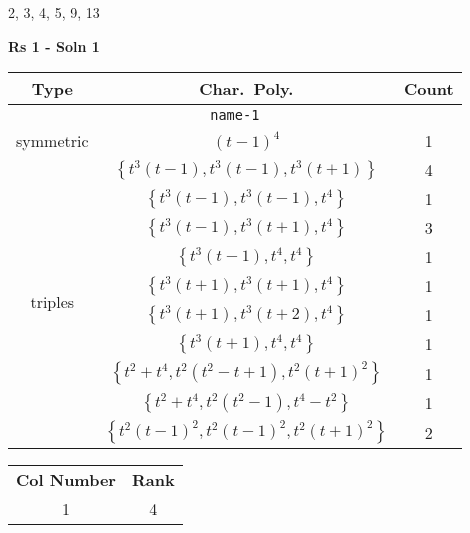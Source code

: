 \documentclass{article}
\begin{document}
    2, 3, 4, 5, 9, 13
    \newpage


    \textbf{Rs 1 - Soln 1}
    \begin{table}
    \begin{tabular}{|c|c|c|}
    \hline
    \textbf{Type} & \textbf{Char.~Poly.} & \textbf{Count} \\
    \hline \multicolumn{3}{|c|}{\texttt{name-1}} \\ \hline
    \multirow{1}{*}{symmetric}
     & $(t - 1)^4$ & 1 \\
    \hline
    \multirow{10}{*}{triples}
     & $\left\{t^3(t - 1),t^3(t - 1),t^3(t + 1)\right\}$ & 4 \\
     & $\left\{t^3(t - 1),t^3(t - 1),t^4\right\}$ & 1 \\
     & $\left\{t^3(t - 1),t^3(t + 1),t^4\right\}$ & 3 \\
     & $\left\{t^3(t - 1),t^4,t^4\right\}$ & 1 \\
     & $\left\{t^3(t + 1),t^3(t + 1),t^4\right\}$ & 1 \\
     & $\left\{t^3(t + 1),t^3(t + 2),t^4\right\}$ & 1 \\
     & $\left\{t^3(t + 1),t^4,t^4\right\}$ & 1 \\
     & $\left\{t^2 + t^4,t^2(t^2 - t + 1),t^2(t + 1)^2\right\}$ & 1 \\
     & $\left\{t^2 + t^4,t^2(t^2 - 1),t^4 - t^2\right\}$ & 1 \\
     & $\left\{t^2(t - 1)^2,t^2(t - 1)^2,t^2(t + 1)^2\right\}$ & 2 \\
    \hline
    \end{tabular}
    \end{table}
    \begin{table}
    \begin{tabular}{|c|c|}
    \hline
    \textbf{Col Number} & \textbf{Rank}\\
    1 & 4 \\ 
    \hline
    \end{tabular}
    \end{table}
    \newpage
    
\end{document}
